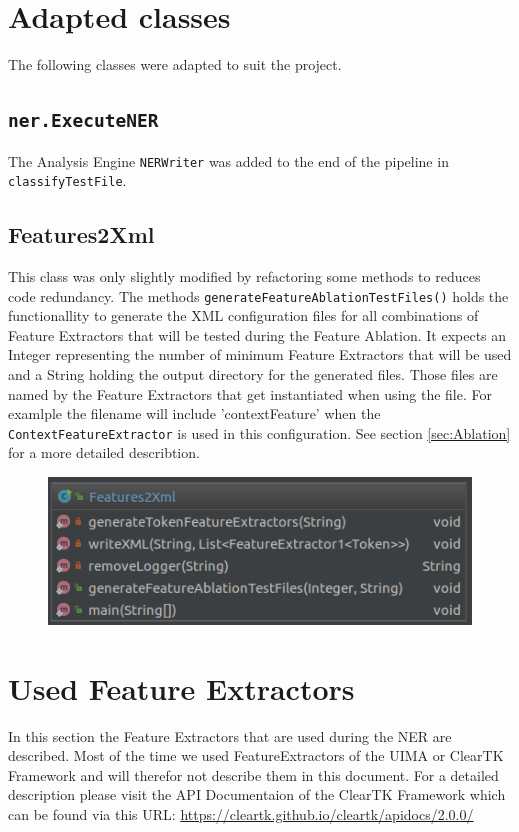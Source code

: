 \documentclass[11pt, english]{article}
\begin{document}
\section{Adapted classes}
The following classes were adapted to suit the project.

\subsection{\texttt{ner.ExecuteNER}}
The Analysis Engine \verb/NERWriter/ was added to the end of the pipeline in \verb/classifyTestFile/.
\subsection{Features2Xml}
\label{sec:Features2Xml}
This class was only slightly modified by refactoring some methods to reduces code redundancy. The methods \verb/generateFeatureAblationTestFiles()/ holds the functionallity to generate the XML configuration files for all combinations of Feature Extractors that will be tested during the Feature Ablation. It expects an Integer representing the number of minimum Feature Extractors that will be used and a String holding the output directory for the generated files. Those files are named by the Feature Extractors that get instantiated when using the file. For examlple the filename will include 'contextFeature' when the \verb/ContextFeatureExtractor/ is used in this configuration. See section \ref{sec:Ablation} for a more detailed describtion.

\begin{figure}
    \centering
    \includegraphics[scale=0.5]{gfx/Features2Xml.png}
    \label{fig:Features2Xml}
\end{figure}

\section{Used Feature Extractors}
In this section the Feature Extractors that are used during the NER are described. Most of the time we used FeatureExtractors of the UIMA or ClearTK Framework and will therefor not describe them in this document. For a detailed description please visit the API Documentaion of the ClearTK Framework which can be found via this URL: \url{https://cleartk.github.io/cleartk/apidocs/2.0.0/}
\end{document}
